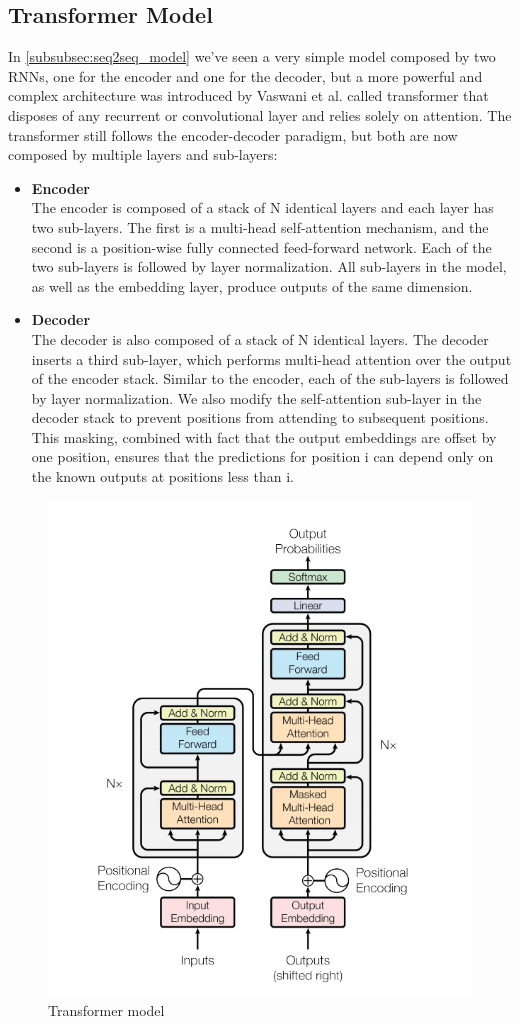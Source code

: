 \subsection{Transformer Model}\label{subsec:transformer_model}
In \ref{subsubsec:seq2seq_model} we've seen a very simple model composed by two RNNs, one for the encoder and one for the decoder, but a more powerful and complex architecture was introduced by Vaswani et al.\cite{vaswani2017attention} called transformer that disposes of any recurrent or convolutional layer and relies solely on attention. The transformer still follows the encoder-decoder paradigm, but both are now composed by multiple layers and sub-layers:
\begin{itemize}
    \item \textbf{Encoder}\\
    The encoder is composed of a stack of N identical layers and each layer has two sub-layers. The first is a multi-head self-attention mechanism, and the second is a position-wise fully connected feed-forward network. Each of the two sub-layers is followed by layer normalization. All sub-layers in the model, as well as the embedding layer, produce outputs of the same dimension.
    \item \textbf{Decoder}\\
    The decoder is also composed of a stack of N identical layers. The decoder inserts a third sub-layer, which performs multi-head attention over the output of the encoder stack. Similar to the encoder, each of the sub-layers is followed by layer normalization. We also modify the self-attention sub-layer in the decoder stack to prevent positions from attending to subsequent positions. This masking, combined with fact that the output embeddings are offset by one position, ensures that the predictions for position i can depend only on the known outputs at positions less than i.
\end{itemize}
\begin{figure}[H]%
    \centering
    \includegraphics[width=0.68\linewidth]{images/transformer.png}
    \caption{Transformer model}
    \label{fig:transformer}
\end{figure}
